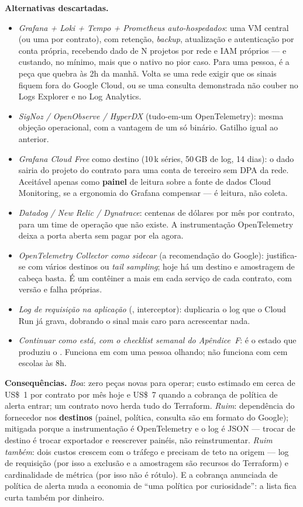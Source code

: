 \textbf{Alternativas descartadas.}
\begin{itemize}
  \item \emph{Grafana + Loki + Tempo + Prometheus auto-hospedados}: uma VM
    central (ou uma por contrato), com retenção, \emph{backup},
    atualização e autenticação por conta própria, recebendo dado de N
    projetos por rede e IAM próprios --- e custando, no mínimo, mais que o
    nativo no pior caso. Para uma pessoa, é a peça que quebra às 2h da
    manhã. Volta se uma rede exigir que os sinais fiquem fora do Google
    Cloud, ou se uma consulta demonstrada não couber no Logs Explorer e no
    Log Analytics.
  \item \emph{SigNoz / OpenObserve / HyperDX} (tudo-em-um OpenTelemetry):
    mesma objeção operacional, com a vantagem de um só binário. Gatilho
    igual ao anterior.
  \item \emph{Grafana Cloud Free} como destino (10\,k séries, 50\,GB de log,
    14 dias): o dado sairia do projeto do contrato para uma conta de
    terceiro sem DPA da rede. Aceitável apenas como \textbf{painel} de leitura
    sobre a fonte de dados Cloud Monitoring, se a ergonomia do Grafana
    compensar --- é leitura, não coleta.
  \item \emph{Datadog / New Relic / Dynatrace}: centenas de dólares por mês
    por contrato, para um time de operação que não existe. A instrumentação
    OpenTelemetry deixa a porta aberta sem pagar por ela agora.
  \item \emph{OpenTelemetry Collector como \emph{sidecar}} (a recomendação do
    Google): justifica-se com vários destinos ou \emph{tail sampling}; hoje
    há um destino e amostragem de cabeça basta. É um contêiner a mais em
    cada serviço de cada contrato, com versão e falha próprias.
  \item \emph{Log de requisição na aplicação} (, interceptor):
    duplicaria o log que o Cloud Run já grava, dobrando o sinal mais caro
    para acrescentar nada.
  \item \emph{Continuar como está, com o \emph{checklist} semanal do
    Apêndice~F}: é o estado que produziu o . Funciona em 
    com uma pessoa olhando; não funciona com cem escolas às 8h.
\end{itemize}

\textbf{Consequências.} \emph{Boa}: zero peças novas para operar; custo
estimado em cerca de US\$~1 por contrato por mês hoje e US\$~7 quando a
cobrança de política de alerta entrar; um contrato novo herda tudo do
Terraform. \emph{Ruim}: dependência do fornecedor nos \textbf{destinos}
(painel, política, consulta são em formato do Google); mitigada porque a
instrumentação é OpenTelemetry e o log é JSON --- trocar de destino é trocar
exportador e reescrever painéis, não reinstrumentar. \emph{Ruim também}: dois
custos crescem com o tráfego e precisam de teto na origem --- log de
requisição (por isso a exclusão e a amostragem são recursos do Terraform) e
cardinalidade de métrica (por isso  não é rótulo). E a
cobrança anunciada de política de alerta muda a economia de \enquote{uma
política por curiosidade}: a lista fica curta também por dinheiro.

